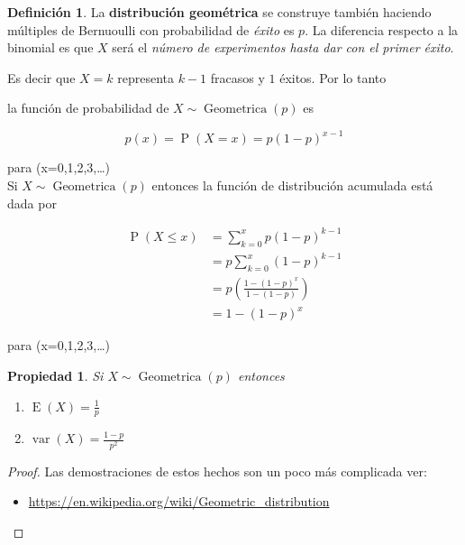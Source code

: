 \documentclass[]{book}
\providecommand{\tightlist}{%
  \setlength{\itemsep}{0pt}\setlength{\parskip}{0pt}}
\theoremstyle{plain}
\newtheorem{property}[theorem]{Propiedad}
\theoremstyle{definition}
\newtheorem{definition}[theorem]{Definición}
\theoremstyle{definition} %
\begin{document}
\begin{definition}
  
La \textbf{distribución geométrica} se construye también haciendo
múltiples de Bernuoulli con probabilidad de \emph{éxito} es \(p\). La
diferencia respecto a la binomial es que \(X\) será el \emph{número de
experimentos hasta dar con el primer éxito}.

Es decir que \(X=k\) representa \(k-1\) fracasos y \(1\) éxitos. Por lo
tanto

la función de probabilidad de
\(\displaystyle X\sim \operatorname {Geometrica} (p)\) es

\[p(x) = \displaystyle \operatorname {P} (X=x)=p(1-p)^{x-1}\]

para (x=0,1,2,3,\dots )\\

Si \(X\sim \operatorname {Geometrica} (p)\) entonces la función de
distribución acumulada está dada por

\[\begin{aligned}\operatorname {P} (X\leq x)&=\sum _{k=0}^{x}p(1-p)^{k-1}\\&=p\sum _{k=0}^{x}(1-p)^{k-1}\\&=p\left({\frac {1-(1-p)^{x}}{1-(1-p)}}\right)\\&=1-(1-p)^{x}\end{aligned}\]

para (x=0,1,2,3,\dots)
\end{definition}

\begin{property}
  Si \(X\sim \operatorname {Geometrica} (p)\) entonces
\begin{enumerate}
  \item $\operatorname {E} (X)={\frac {1}{p}}$
  \item $\operatorname {var} (X)={\frac {1-p}{p^{2}}}$
\end{enumerate}
\end{property}


\begin{proof}
  Las demostraciones de estos hechos son un poco más complicada ver:

\begin{itemize}
\tightlist
\item
  \url{https://en.wikipedia.org/wiki/Geometric_distribution}
\end{itemize}
\end{proof}
\end{document}
